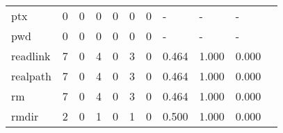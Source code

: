 \begin{longtable}{lp{1.2cm}p{1.2cm}p{1.2cm}p{1.2cm}p{1.2cm}p{1.2cm}p{1.2cm}p{1.2cm}p{1.2cm}p{1.2cm}}
ptx       &                                     0 &                                                  0 &                                                0 &                                               0 &                                                0 &                                              0 &                                             - &                                                  - &                                                  - \\
pwd       &                                     0 &                                                  0 &                                                0 &                                               0 &                                                0 &                                              0 &                                             - &                                                  - &                                                  - \\
readlink  &                                     7 &                                                  0 &                                                4 &                                               0 &                                                3 &                                              0 &                                         0.464 &                                              1.000 &                                              0.000 \\
realpath  &                                     7 &                                                  0 &                                                4 &                                               0 &                                                3 &                                              0 &                                         0.464 &                                              1.000 &                                              0.000 \\
rm        &                                     7 &                                                  0 &                                                4 &                                               0 &                                                3 &                                              0 &                                         0.464 &                                              1.000 &                                              0.000 \\
rmdir     &                                     2 &                                                  0 &                                                1 &                                               0 &                                                1 &                                              0 &                                         0.500 &                                              1.000 &                                              0.000 \\

\end{longtable}
